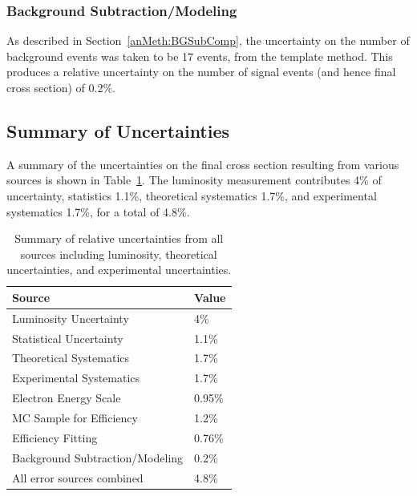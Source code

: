 \subsubsection{Background Subtraction/Modeling}
\label{anMeth:SystsOtherBGSub}


As described in Section~\ref{anMeth:BGSubComp}, 
the uncertainty on the number of background 
events was taken to be 17 events, 
from the template method.  
This produces a relative uncertainty 
on the number of signal events 
(and hence final cross section) 
of 0.2\%.  

\subsection{Summary of Uncertainties}
\label{anMeth:SystsSummary}

A summary of the uncertainties on the final 
cross section resulting from various sources 
is shown in Table~\ref{TableSystsSummary}.  
The luminosity measurement 
contributes 4\% of uncertainty, 
statistics 1.1\%, 
theoretical systematics 1.7\%, 
and experimental systematics 1.7\%, %
for a total of 4.8\%.  

\begin{table}[htbp]
  \begin{center}
    \caption[\fixspacing Summary of uncertainties]{
      \fixspacing Summary of relative uncertainties from all sources 
      including luminosity, theoretical uncertainties, 
      and experimental uncertainties.  
    }
    \label{TableSystsSummary}
    \begin{tabular}[]{ | l | l | }
      \hline
      Source & Value  \\ \hline \hline
      Luminosity Uncertainty & 4\% \\ \hline 
      Statistical Uncertainty & 1.1\% \\ \hline 
      Theoretical Systematics & 1.7\% \\ \hline \hline 
      Experimental Systematics & 1.7\% \\ \hline \hline 
      Electron Energy Scale & 0.95\% \\ \hline 
      MC Sample for Efficiency & 1.2\% \\ \hline 
      Efficiency Fitting & 0.76\% \\ \hline 
      Background Subtraction/Modeling & 0.2\% \\ \hline \hline 
      All error sources combined & 4.8\% \\ \hline 
    \end{tabular}
  \end{center}
\end{table}


